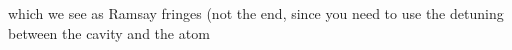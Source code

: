 \begin{itemize}
		\noindent which we see as Ramsay fringes (not the end, since you need to use the detuning between the cavity and the atom
		
	\end{itemize}

\newpage
